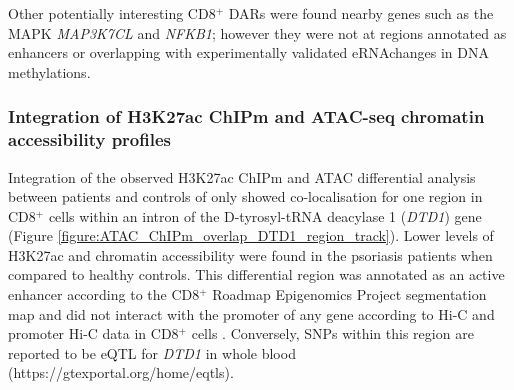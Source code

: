 Other potentially interesting CD8$^+$ DARs were found nearby genes such as the MAPK \textit{MAP3K7CL} and \textit{NFKB1}; however they were not at regions annotated as enhancers or overlapping with experimentally validated eRNAchanges in DNA methylations. 


\subsubsection{Integration of H3K27ac ChIPm and ATAC-seq chromatin accessibility profiles}

Integration of the observed H3K27ac ChIPm and ATAC differential analysis between patients and controls of only showed co-localisation for one region in CD8$^+$ cells within an intron of the D-tyrosyl-tRNA deacylase 1 (\textit{DTD1}) gene (Figure \ref{figure:ATAC_ChIPm_overlap_DTD1_region_track}). Lower levels of H3K27ac and chromatin accessibility were found in the psoriasis patients when compared to healthy controls. This differential region was annotated as an active enhancer according to the CD8$^+$ Roadmap Epigenomics Project segmentation map and did not interact with the promoter of any gene according to Hi-C and promoter Hi-C data in CD8$^+$ cells \parencite{Javierre2016}. Conversely, SNPs within this region are reported to be eQTL for \textit{DTD1} in whole blood (https://gtexportal.org/home/eqtls). 

